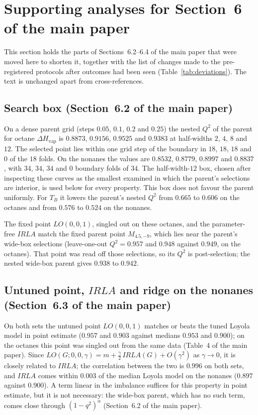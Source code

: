 \documentclass[a5paper, 10pt]{article}
\theoremstyle{plain}
\theoremstyle{remark}
\theoremstyle{definition}
\begin{document}
\section{Supporting analyses for Section~6 of the main paper}\label{sec:s-qspr}

This section holds the parts of Sections~6.2--6.4 of the main paper that were moved here to shorten it,
together with the list of changes made to the pre-registered protocols after outcomes had been seen
(Table~\ref{tab:deviations}). The text is unchanged apart from cross-references.

\subsection{Search box (Section~6.2 of the main paper)}

On a dense parent
grid (steps $0.05$, $0.1$, $0.2$ and $0.25$) the nested $Q^2$ of the
parent for octane $\Delta H_{\mathrm{vap}}$ is $0.8873$, $0.9156$,
$0.9525$ and $0.9383$ at half-widths $2$, $4$, $8$ and $12$. The
selected point lies within one grid step of the boundary in $18$, $18$,
$18$ and $0$ of the $18$ folds. On the nonanes the values are $0.8532$,
$0.8779$, $0.8997$ and $0.8837$, with $34$, $34$, $34$ and $0$ boundary
folds of $34$. The half-width-$12$ box, chosen after inspecting these
curves as the smallest examined in which the parent's selections are
interior, is used below for every property. This box does not favour the parent uniformly. For $T_B$ it lowers the parent's nested $Q^2$ from $0.665$ to $0.606$ on the octanes and from $0.576$ to $0.524$ on the nonanes.

The
fixed point $LO(0,0,1)$, singled out on these octanes, and the parameter-free $IRLA$ match the fixed parent point $M_{4.5,-9}$, which lies near the parent's wide-box selections (leave-one-out $Q^2 = 0.957$ and $0.948$ against $0.949$, on the octanes). That point was read off those selections, so its $Q^2$ is post-selection; the nested wide-box parent gives $0.938$ to $0.942$.

\subsection{Untuned point, $IRLA$ and ridge on the nonanes (Section~6.3 of the main paper)}

On both sets the untuned point $LO(0,0,1)$ matches or beats the tuned
Loyola model in point estimate ($0.957$ and $0.903$ against medians $0.953$ and $0.900$);
on the octanes this point was singled out from the same data
(Table~4 of the main paper).
Since $LO(G;0,0,\gamma) = m + \tfrac{\gamma}{2}\,IRLA(G) + O(\gamma^2)$
as $\gamma \to 0$, it is closely related to $IRLA$; the correlation
between the two is $0.996$ on both sets, and $IRLA$ comes within
$0.003$ of the median Loyola model on the nonanes ($0.897$ against
$0.900$). A term linear in the imbalance suffices for this property in
point estimate, but it is not necessary: the wide-box parent, which has no
such term, comes close through $(1-q^2)^{\alpha}$ (Section~6.2 of the main paper).
\end{document}
